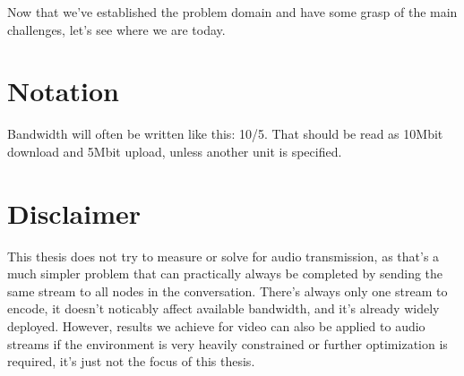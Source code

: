 Now that we've established the problem domain and have some grasp of the main challenges, let's see where we are today.


\section{Notation}

Bandwidth will often be written like this: 10/5. That should be read as 10Mbit download and 5Mbit upload, unless another unit is specified.


\section{Disclaimer}

This thesis does not try to measure or solve for audio transmission, as that's a much simpler problem that can practically always be completed by sending the same stream to all nodes in the conversation. There's always only one stream to encode, it doesn't noticably affect available bandwidth, and it's already widely deployed. However, results we achieve for video can also be applied to audio streams if the environment is very heavily constrained or further optimization is required, it's just not the focus of this thesis.
